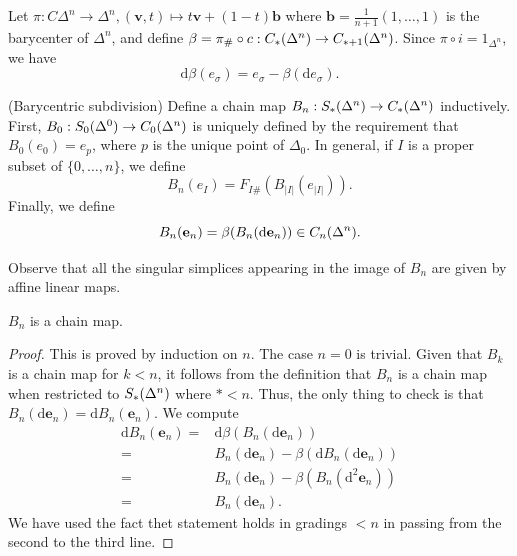 \documentclass[a4paper,11pt]{article}
\begin{document}
				Let $\pi:C\Delta^n\rightarrow \Delta^n, (\textbf{v},t)\mapsto t\textbf{v}+(1-t)\textbf{b}$ where $\textbf{b}=\frac{1}{n+1}(1,\dots,1)$ is the barycenter of $\Delta^n$, and define $\beta=\pi_\#\circ c:\cx{\Delta^n}\rightarrow \cx[\ast+1]{\Delta^n}$. Since $\pi\circ i=1_{\Delta^n}$, we have
				\begin{equation*}
					\mathrm{d}\beta(e_\sigma)=e_\sigma-\beta(\mathrm{d}e_\sigma).
				\end{equation*} 

				\begin{defi}(Barycentric subdivision)
					Define a chain map $B_n:\sx{\Delta^n}\rightarrow \cx{\Delta^n}$ inductively. First, $B_0:\sx[0]{\Delta^0}\rightarrow \cx[0]{\Delta^n}$ is uniquely defined by the requirement that $B_0(e_0)=e_p$, where $p$ is the unique point of $\Delta_0$. In general, if $I$ is a proper subset of $\{0,\dots,n\}$, we define
					\begin{equation*}
						B_n(e_I)=F_{I\#}(B_{|I|}(e_{|I|})).
					\end{equation*}
					Finally, we define
					\begin{equation*}
						B_n(\textbf{e}_n)=\beta(B_n(\mathrm{d}\textbf{e}_n))\in\cx[n]{\Delta^n}.
					\end{equation*}
				\end{defi}

				Observe that all the singular simplices appearing in the image of $B_n$ are given by affine linear maps.

				\begin{lemma}
					$B_n$ is a chain map.
				\end{lemma}
				\begin{proof}
					This is proved by induction on $n$. The case $n=0$ is trivial. Given that $B_k$ is a chain map for $k<n$, it follows from the definition that $B_n$ is a chain map when restricted to $\sx{\Delta^n}$ where $\ast<n$. Thus, the only thing to check is that $B_n(\mathrm{d}\textbf{e}_n)=\mathrm{d}B_n(\textbf{e}_n)$. We compute
					\begin{align*}
						\mathrm{d}B_n(\textbf{e}_n)=&\mathrm{d}\beta(B_n(\mathrm{d}\textbf{e}_n))\\
						=&B_n(\mathrm{d}\textbf{e}_n)-\beta(\mathrm{d}B_n(\mathrm{d}\textbf{e}_n))\\
						=&B_n(\mathrm{d}\textbf{e}_n)-\beta(B_n(\mathrm{d}^2\textbf{e}_n))\\
						=&B_n(\mathrm{d}\textbf{e}_n).
					\end{align*}
					We have used the fact thet statement holds in gradings $<n$ in passing from the second to the third line.
				\end{proof}
\end{document}
